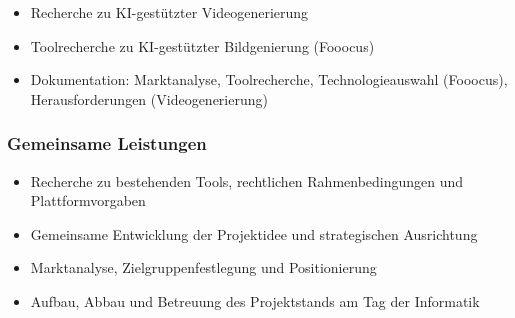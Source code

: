 \documentclass[a4paper,12pt]{article}
\begin{document}
\begin{itemize}
    \item Recherche zu KI-gestützter Videogenerierung
    \item Toolrecherche zu KI-gestützter Bildgenierung (Fooocus)
    \item Dokumentation: Marktanalyse, Toolrecherche, Technologieauswahl (Fooocus), Herausforderungen (Videogenerierung)
\end{itemize}

\subsubsection*{Gemeinsame Leistungen}

\begin{itemize}
    \item Recherche zu bestehenden Tools, rechtlichen Rahmenbedingungen und Plattformvorgaben
    \item Gemeinsame Entwicklung der Projektidee und strategischen Ausrichtung
    \item Marktanalyse, Zielgruppenfestlegung und Positionierung
    \item Aufbau, Abbau und Betreuung des Projektstands am Tag der Informatik
\end{itemize}
\end{document}

